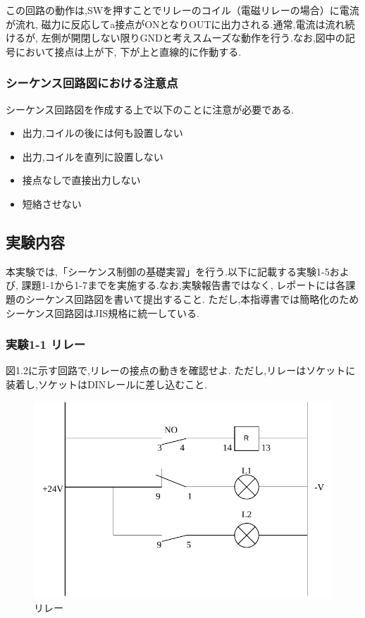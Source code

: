 この回路の動作は,SWを押すことでリレーのコイル（電磁リレーの場合）に電流が流れ,
磁力に反応してa接点がONとなりOUTに出力される.通常,電流は流れ続けるが,
左側が開閉しない限りGNDと考えスムーズな動作を行う.なお,図中の記号において接点は上が下,
下が上と直線的に作動する.

\subsubsection{シーケンス回路図における注意点}
シーケンス回路図を作成する上で以下のことに注意が必要である.
\begin{itemize}
  \item 出力,コイルの後には何も設置しない
  \item 出力,コイルを直列に設置しない
  \item 接点なしで直接出力しない
  \item 短絡させない
\end{itemize}

\subsection{実験内容}

本実験では,「シーケンス制御の基礎実習」を行う.以下に記載する実験1-5および,
課題1-1から1-7までを実施する.なお,実験報告書ではなく,
レポートには各課題のシーケンス回路図を書いて提出すること.
ただし,本指導書では簡略化のためシーケンス回路図はJIS規格に統一している.

\subsubsection{実験1-1 リレー}
図1.2に示す回路で,リレーの接点の動きを確認せよ.
ただし,リレーはソケットに装着し,ソケットはDINレールに差し込むこと.

\begin{figure}[h]
  \centering
  \includegraphics[scale=0.5]{sozai/1_compressed.pdf}
  \caption{リレー}
\end{figure}


